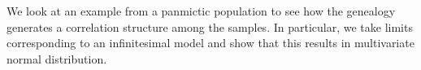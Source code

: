 We look at an example from a panmictic population to see how the genealogy generates a correlation structure among the
samples. In particular, we take limits corresponding to an infinitesimal model and show that this results in multivariate 
normal distribution. 

